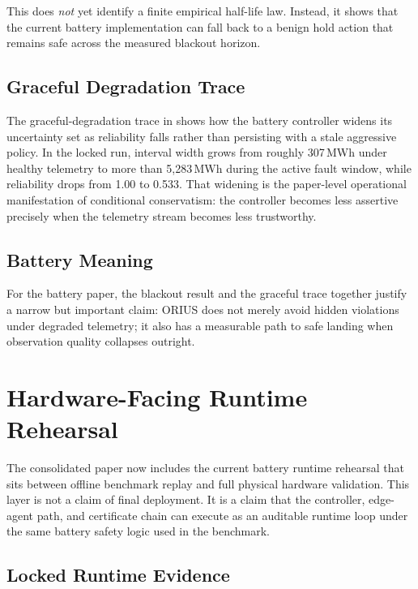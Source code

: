 This does \emph{not} yet identify a finite empirical half-life law.  Instead,
it shows that the current battery implementation can fall back to a benign
hold action that remains safe across the measured blackout horizon.

\subsection{Graceful Degradation Trace}

The graceful-degradation trace in
 shows how the battery
controller widens its uncertainty set as reliability falls rather than
persisting with a stale aggressive policy.  In the locked run, interval width
grows from roughly 307\,MWh under healthy telemetry to more than
5{,}283\,MWh during the active fault window, while reliability drops from
1.00 to 0.533.  That widening is the paper-level operational manifestation of
conditional conservatism: the controller becomes less assertive precisely when
the telemetry stream becomes less trustworthy.

\subsection{Battery Meaning}

For the battery paper, the blackout result and the graceful trace together
justify a narrow but important claim: ORIUS does not merely avoid hidden
violations under degraded telemetry; it also has a measurable path to safe
landing when observation quality collapses outright.

\section{Hardware-Facing Runtime Rehearsal}\label{sec:hil_rehearsal}

The consolidated paper now includes the current battery runtime rehearsal that
sits between offline benchmark replay and full physical hardware validation.
This layer is not a claim of final deployment.  It is a claim that the
controller, edge-agent path, and certificate chain can execute as an auditable
runtime loop under the same battery safety logic used in the benchmark.

\subsection{Locked Runtime Evidence}

